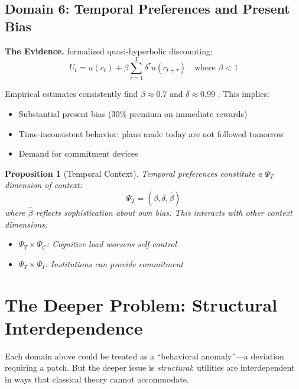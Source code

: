 \documentclass[12pt]{article}
\newtheorem{proposition}{Proposition}
\begin{document}
\subsection{Domain 6: Temporal Preferences and Present Bias}

\textbf{The Evidence.} \citet{laibson1997} formalized quasi-hyperbolic discounting:
\begin{equation}
U_t = u(c_t) + \beta \sum_{\tau=1}^{T} \delta^\tau u(c_{t+\tau}) \quad \text{where } \beta < 1
\end{equation}

Empirical estimates consistently find $\beta \approx 0.7$ and $\delta \approx 0.99$ \citep{frederick2002,cohenetal2020}. This implies:
\begin{itemize}
    \item Substantial present bias (30\% premium on immediate rewards)
    \item Time-inconsistent behavior: plans made today are not followed tomorrow
    \item Demand for commitment devices \citep{ashraf2006,bryan2010}
\end{itemize}

\begin{proposition}[Temporal Context]
Temporal preferences constitute a $\Psi_T$ dimension of context:
\begin{equation}
\Psi_T = (\beta, \delta, \hat{\beta})
\end{equation}
where $\hat{\beta}$ reflects sophistication about own bias. This interacts with other context dimensions:
\begin{itemize}
    \item $\Psi_T \times \Psi_C$: Cognitive load worsens self-control
    \item $\Psi_T \times \Psi_I$: Institutions can provide commitment
\end{itemize}
\end{proposition}



\section{The Deeper Problem: Structural Interdependence}
\label{sec:interdependence}

Each domain above could be treated as a ``behavioral anomaly''---a deviation requiring a patch. But the deeper issue is \textit{structural}: utilities are interdependent in ways that classical theory cannot accommodate.
\end{document}
